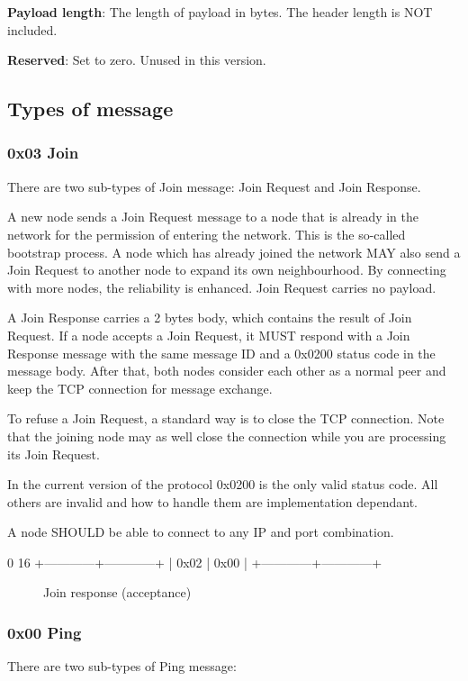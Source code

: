 \documentclass[12pt, a4paper]{article}
\begin{document}
\textbf{Payload length}: The length of payload in bytes.
The header length is NOT included.

\textbf{Reserved}: Set to zero. Unused in this version.

\subsection{Types of message}
\subsubsection{0x03 Join}
There are two sub-types of Join message: Join Request and Join Response.

A new node sends a Join Request message to a node that is already in the network for the permission of entering the network.
This is the so-called bootstrap process.
A node which has already joined the network MAY also send a Join Request to another node to expand its own neighbourhood.
By connecting with more nodes, the reliability is enhanced.
Join Request carries no payload.

A Join Response carries a 2 bytes body, which contains the result of Join Request.
If a node accepts a Join Request, it MUST respond with a Join Response message with the same message ID and a 0x0200 status code in the message body.
After that, both nodes consider each other as a normal peer and keep the TCP connection for message exchange.

To refuse a Join Request, a standard way is to close the TCP connection.
Note that the joining node may as well close the connection while you are processing its Join Request.

In the current version of the protocol 0x0200 is the only valid status code.
All others are invalid and how to handle them are implementation dependant.

A node SHOULD be able to connect to any IP and port combination.


\begin{verbbox}
0                          16
+------------+------------+
|    0x02    |    0x00    |
+------------+------------+
\end{verbbox}

\begin{figure}[h!]
  \centering
  \theverbbox
  \label{joinresponse}
  \caption{Join response (acceptance)}
\end{figure}

\subsubsection{0x00 Ping}
There are two sub-types of Ping message:
\end{document}
